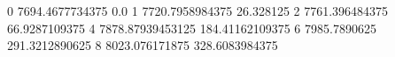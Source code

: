0 7694.4677734375 0.0
1 7720.7958984375 26.328125
2 7761.396484375 66.9287109375
4 7878.87939453125 184.41162109375
6 7985.7890625 291.3212890625
8 8023.076171875 328.6083984375

